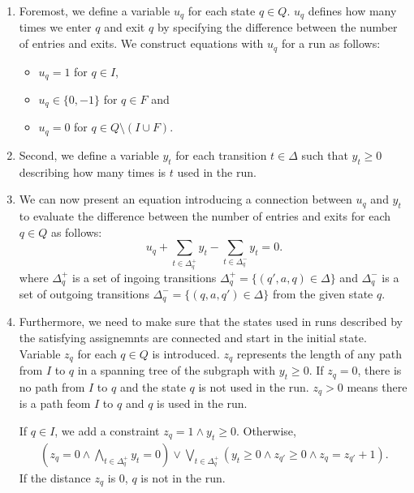 \begin{enumerate}
    \item \label{clauses:u_original} Foremost, we define a variable $u_{q}$ for each state $q \in Q$. $u_{q}$ defines how many times we enter $q$ and exit $q$ by specifying the difference between the number of entries and exits. We construct equations with $u_{q}$ for a run as follows:
    \begin{itemize}
        \item $u_{q} = 1$ for $q \in I$,
        \item $u_{q} \in \{ 0, -1 \}$ for $q \in F$ and
        \item $u_{q} = 0$ for $q \in Q \setminus ( I \cup F )$.
    \end{itemize}

    \item \label{clauses:y_original} Second, we define a variable $y_{t}$ for each transition $t \in \Delta$ such that $y_{t} \geq 0$ describing how many times is $t$ used in the run.

    \item \label{clauses:uy_original} We can now present an equation introducing a connection between $u_{q}$ and $y_{t}$ to evaluate the difference between the number of entries and exits for each $q \in Q$ as follows:
    $$ u_q + \sum_{t \in \Delta_q^+} y_t - \sum_{t \in \Delta_q^-} y_t = 0.$$
    where $\Delta_q^+$ is a set of ingoing transitions $ \Delta_q^+ = \{ (q',a,q) \in \Delta \}$ and $\Delta_q^-$ is a set of outgoing transitions $ \Delta_q^- = \{ (q,a,q') \in \Delta \} $ from the given state $q$.

    \item \label{clauses:z_original} Furthermore, we need to make sure that the states used in runs described by the satisfying assignemnts are connected and start in the initial state. Variable $z_q$ for each $q \in Q$ is introduced. $z_q$ represents the length of any path from $I$ to $q$ in a spanning tree of the subgraph with $y_t \geq 0$. If $z_q = 0$, there is no path from $I$ to $q$ and the state $q$ is not used in the run. $z_q > 0$ means there is a path feom $I$ to $q$ and $q$ is used in the run.

    If $q \in I$, we add a constraint $z_q = 1 \land y_t \geq 0$. Otherwise,
    {
    \begin{align*}
        (z_q = 0 \land \bigwedge_{t \in \Delta_q^+} y_t = 0) \lor \bigvee_{t \in \Delta_q^+} (y_t \geq 0 \land z_{q'} \geq 0 \land z_q = z_{q'} + 1) \text{.}
    \end{align*}
    }
    If the distance $z_q$ is $0$, $q$ is not in the run.


\end{enumerate}
